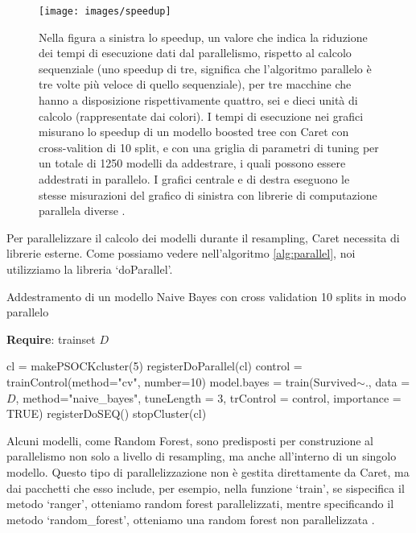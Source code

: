 \documentclass[12pt]{article}
\begin{document}
\begin{figure}[H]
    \centering
    \texttt{[image: images/speedup]}
    \caption{Nella figura a sinistra lo speedup, un valore che indica la riduzione dei tempi di esecuzione dati dal parallelismo, rispetto al calcolo sequenziale (uno speedup di tre, significa che l'algoritmo parallelo è tre volte più veloce di quello sequenziale), 
    per tre macchine che hanno a disposizione rispettivamente quattro, sei e dieci unità di calcolo (rappresentate dai colori). I tempi di esecuzione nei grafici misurano lo speedup di un modello boosted tree con Caret con cross-valition di 10 split, 
    e con una griglia di parametri di tuning per un totale di 1250 modelli da addestrare, i quali possono essere addestrati in parallelo. I grafici centrale e di destra eseguono le stesse misurazioni del grafico di sinistra con librerie di computazione parallela diverse \cite{cit:parallel}.}%
    \label{img:speedup}
\end{figure}

Per parallelizzare il calcolo dei modelli durante il resampling, Caret necessita di librerie esterne. Come possiamo vedere nell'algoritmo \ref{alg:parallel}, noi utilizziamo la libreria ‘doParallel’.

\begin{algorithm}[H]
    \caption{Addestramento di un modello Naive Bayes con cross validation 10 splits in modo parallelo}\label{alg:parallel}
    \textbf{Require}: trainset $D$
    \begin{algorithmic}[1]
    \State cl = makePSOCKcluster(5)  
    \State registerDoParallel(cl) 
    \State control = trainControl(method="cv", number=10)
    \State model.bayes = train(Survived$\sim.$, data = $D$, method="naive\_bayes", tuneLength = 3, trControl = control, importance = TRUE)
    \State registerDoSEQ() 
    \State stopCluster(cl)
    \end{algorithmic}
\end{algorithm}

Alcuni modelli, come Random Forest, sono predisposti per construzione al parallelismo non solo a livello di resampling, ma anche all'interno di un singolo modello. 
Questo tipo di parallelizzazione non è gestita direttamente da Caret, ma dai pacchetti che esso include, per esempio, nella funzione ‘train’, se sispecifica il metodo ‘ranger’, otteniamo random forest parallelizzati, 
mentre specificando il metodo ‘random\_forest’, otteniamo una random forest non parallelizzata \cite{cit:ranger,cit:randomForest}.
\end{document}
